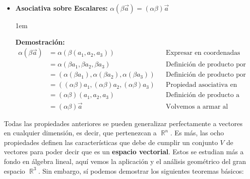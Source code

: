 \documentclass[12pt, fleqn]{report}                             %
\newenvironment{SmallIndentation}[1][0.75em]                    %
    {\begin{adjustwidth}{#1}{}\begin{footnotesize}}                 %
    {\end{footnotesize}\end{adjustwidth}}                           %
\newcommand{\Wrap}[1]{\left( #1 \right)}                        %
\DeclareMathOperator \Reals        {\mathbb{R}}                 %
\begin{document}
\begin{itemize}
                \item \textbf{Asociativa sobre Escalares:}
                    $\alpha \Wrap{ \beta \vec{a} } = (\alpha \beta)\vec{a}$
                
                    \begin{SmallIndentation}[1em]
                        \textbf{Demostración:}
                        \begin{align*}
	                        \alpha\left(\beta\vec{a}\right) &= \alpha(\beta(a_1, a_2, a_3)) &&\mbox{Expresar en coordenadas}\\
	                        &= \alpha(\beta a_1, \beta a_2, \beta a_3) &&\mbox{Definición de producto por escalar}\\
	                        &= (\alpha(\beta a_1), \alpha(\beta a_2), \alpha(\beta a_3)) &&\mbox{Definición de producto por escalar}\\
	                        &= ((\alpha \beta)a_1, (\alpha \beta)a_2, (\alpha \beta)a_3) &&\mbox{Propiedad asociativa en los reales}\\
	                        &= (\alpha \beta)(a_1, a_2, a_3) &&\mbox{Definición de producto a la inversa}\\
	                        &= (\alpha \beta)\vec{a} &&\mbox{Volvemos a armar al vector}
                        \end{align*}
                    \end{SmallIndentation}

            \end{itemize}
        
            Todas las propiedades anteriores se pueden generalizar perfectamente a vectores en cualquier
            dimensión, es decir, que pertenezcan a $\Reals^n$.  Es más, las ocho propiedades definen las características que debe de cumplir un conjunto $V$ de vectores para poder decir que es un \textbf{espacio vectorial}. Estos se estudian más a fondo en álgebra lineal, aquí vemos la aplicación y el análisis geométrico del gran espacio $\Reals^3$. Sin embargo, sí podemos demostrar los siguientes teoremas básicos:
            
\end{document}
